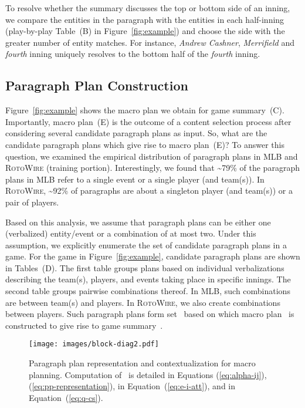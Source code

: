 \documentclass[11pt,a4paper]{article}
\begin{document}
To resolve whether the summary discusses the top or bottom side of an
inning, we compare the entities in the paragraph with the entities in
each half-inning (play-by-play Table~(B) in Figure~\ref{fig:example})
and choose the side with the greater number of entity matches.  For
instance, \textsl{Andrew Cashner}, \textsl{Merrifield} and
\textsl{fourth} inning uniquely resolves to the bottom half of the
\textsl{fourth} inning.






\subsection{Paragraph Plan Construction}
\label{sec:paragr-plan-constr}

Figure~\ref{fig:example} shows the macro plan we obtain for game
summary~(C). Importantly, macro plan~(E) is the outcome of a content
selection process after considering several candidate paragraph plans
as input. So, what are the candidate paragraph plans which give rise
to macro plan~(E)?  To answer this question, we examined the empirical
distribution of paragraph plans in MLB and \textsc{RotoWire} (training
portion). Interestingly, we found that \textasciitilde 79\% of the
paragraph plans in MLB refer to a single event or a single player (and
team(s)). In \textsc{RotoWire}, \textasciitilde 92\% of paragraphs are
about a singleton player (and team(s)) or a pair of players.


Based on this analysis, we assume that paragraph plans can be either
one (verbalized) entity/event or a combination of at most two. Under
this assumption, we explicitly enumerate the set of candidate
paragraph plans in a game. For the game in Figure~\ref{fig:example},
candidate paragraph plans are shown in Tables~(D). The first table
groups plans based on individual verbalizations describing the
team(s), players, and events taking place in specific innings. The
second table groups pairwise combinations thereof. In MLB, such
combinations are between team(s) and players. In \textsc{RotoWire}, we
also create combinations between players. Such paragraph plans form
set~ based on which macro plan~ is constructed to give rise to
game summary~.





\begin{figure}[t]
  \centering
  \texttt{[image: images/block-diag2.pdf]}
\caption{Paragraph plan representation and contextualization for
    macro planning.  Computation of~ is detailed in
    Equations (\ref{eq:alpha-ij}), (\ref{eq:pp-representation}),
     in Equation~(\ref{eq:e-i-att}), and
     in Equation~(\ref{eq:q-cs}). }
  \label{fig:content-selection}
\end{figure}
\end{document}
